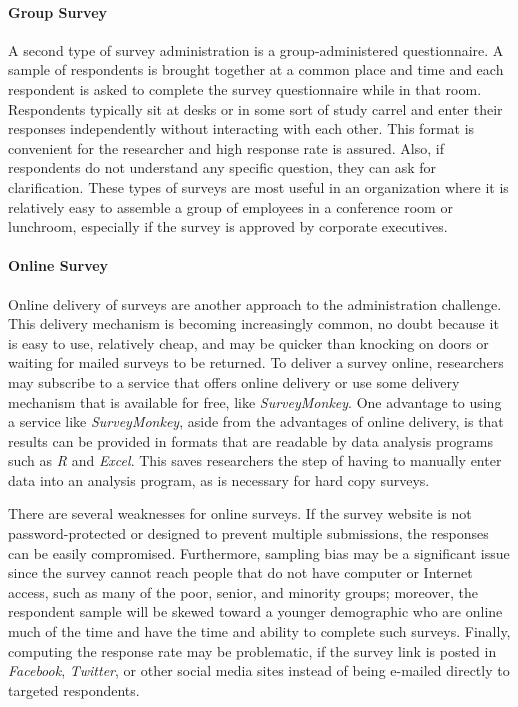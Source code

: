\paragraph{Group Survey}

A second type of survey administration is a group-administered questionnaire. A sample of respondents is brought together at a common place and time and each respondent is asked to complete the survey questionnaire while in that room. Respondents typically sit at desks or in some sort of study carrel and enter their responses independently without interacting with each other. This format is convenient for the researcher and high response rate is assured. Also, if respondents do not understand any specific question, they can ask for clarification. These types of surveys are most useful in an organization where it is relatively easy to assemble a group of employees in a conference room or lunchroom, especially if the survey is approved by corporate executives.

\paragraph{Online Survey}

Online delivery of surveys are another approach to the administration challenge. This delivery mechanism is becoming increasingly common, no doubt because it is easy to use, relatively cheap, and may be quicker than knocking on doors or waiting for mailed surveys to be returned. To deliver a survey online, researchers may subscribe to a service that offers online delivery or use some delivery mechanism that is available for free, like \textit{SurveyMonkey}. One advantage to using a service like \textit{SurveyMonkey}, aside from the advantages of online delivery, is that results can be provided in formats that are readable by data analysis programs such as \textit{R} and \textit{Excel}. This saves researchers the step of having to manually enter data into an analysis program, as is necessary for hard copy surveys.

There are several weaknesses for online surveys. If the survey website is not password-protected or designed to prevent multiple submissions, the responses can be easily compromised. Furthermore, sampling bias may be a significant issue since the survey cannot reach people that do not have computer or Internet access, such as many of the poor, senior, and minority groups; moreover, the respondent sample will be skewed toward a younger demographic who are online much of the time and have the time and ability to complete such surveys. Finally, computing the response rate may be problematic, if the survey link is posted in \textit{Facebook}, \textit{Twitter}, or other social media sites instead of being e-mailed directly to targeted respondents. 

